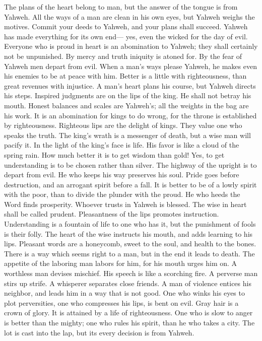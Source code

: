  The plans of the heart belong to man, but the answer of
the tongue is from Yahweh.  All the ways of a man are
clean in his own eyes, but Yahweh weighs the motives. 
Commit your deeds to Yahweh, and your plans shall succeed.
 Yahweh has made everything for its own end--- yes, even
the wicked for the day of evil.  Everyone who is proud in
heart is an abomination to Yahweh; they shall certainly not be
unpunished.  By mercy and truth iniquity is atoned for. By
the fear of Yahweh men depart from evil.  When a man's
ways please Yahweh, he makes even his enemies to be at peace with him.
 Better is a little with righteousness, than great
revenues with injustice.  A man's heart plans his course,
but Yahweh directs his steps.  Inspired judgments are on
the lips of the king. He shall not betray his mouth. 
Honest balances and scales are Yahweh's; all the weights in the bag are
his work.  It is an abomination for kings to do wrong,
for the throne is established by righteousness. 
Righteous lips are the delight of kings. They value one who speaks the
truth.  The king's wrath is a messenger of death, but a
wise man will pacify it.  In the light of the king's face
is life. His favor is like a cloud of the spring rain. 
How much better it is to get wisdom than gold! Yes, to get understanding
is to be chosen rather than silver.  The highway of the
upright is to depart from evil. He who keeps his way preserves his soul.
 Pride goes before destruction, and an arrogant spirit
before a fall.  It is better to be of a lowly spirit with
the poor, than to divide the plunder with the proud.  He
who heeds the Word finds prosperity. Whoever trusts in Yahweh is
blessed.  The wise in heart shall be called prudent.
Pleasantness of the lips promotes instruction. 
Understanding is a fountain of life to one who has it, but the
punishment of fools is their folly.  The heart of the
wise instructs his mouth, and adds learning to his lips. 
Pleasant words are a honeycomb, sweet to the soul, and health to the
bones.  There is a way which seems right to a man, but in
the end it leads to death.  The appetite of the laboring
man labors for him, for his mouth urges him on.  A
worthless man devises mischief. His speech is like a scorching fire.
 A perverse man stirs up strife. A whisperer separates
close friends.  A man of violence entices his neighbor,
and leads him in a way that is not good.  One who winks
his eyes to plot perversities, one who compresses his lips, is bent on
evil.  Gray hair is a crown of glory. It is attained by a
life of righteousness.  One who is slow to anger is
better than the mighty; one who rules his spirit, than he who takes a
city.  The lot is cast into the lap, but its every
decision is from Yahweh.

